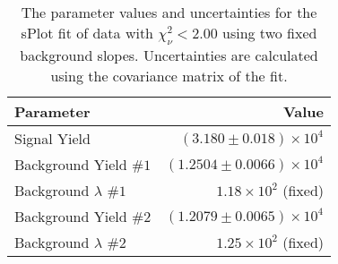 
\begin{table}[ht]
    \begin{center}
        \begin{tabular}{lr}\toprule
            Parameter & Value \\\midrule
            Signal Yield & $(3.180 \pm 0.018) \times 10^{4}$ \\
            Background Yield $\#1$ & $(1.2504 \pm 0.0066) \times 10^{4}$ \\
            Background $\lambda$ $\#1$ & $1.18 \times 10^{2}$ (fixed) \\
            Background Yield $\#2$ & $(1.2079 \pm 0.0065) \times 10^{4}$ \\
            Background $\lambda$ $\#2$ & $1.25 \times 10^{2}$ (fixed) \\\bottomrule
        \end{tabular}
        \caption{The parameter values and uncertainties for the sPlot fit of data with $\chi^2_\nu < 2.00$ using two fixed background slopes. Uncertainties are calculated using the covariance matrix of the fit.}\label{tab:splot-fit-results-chisqdof-2.00-fixed-2}
    \end{center}
\end{table}
